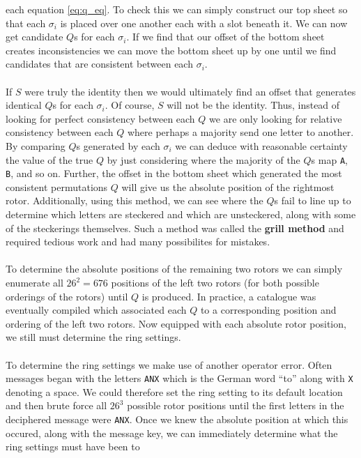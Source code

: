each equation \ref{eq:q_eq}. To check this we can simply construct
our top sheet so that each $\sigma_i$ is placed over one another each
with a slot beneath it. We can now get candidate $Q$s for each
$\sigma_i$. If we find that our offset of the bottom sheet creates
inconsistencies we can move the bottom sheet up by one until we find
candidates that are consistent between each $\sigma_i$.
\\\\If $S$ were truly the identity then we would ultimately find an
offset that generates identical $Q$s for each $\sigma_i$. Of course,
$S$ will not be the identity. Thus, instead of looking for perfect
consistency between each $Q$ we are only looking for relative
consistency between each $Q$ where perhaps a majority send one letter
to another. By comparing $Q$s generated by each $\sigma_i$ we can
deduce with reasonable certainty the value of the true $Q$ by just
considering where the majority of the $Q$s map \texttt{A},
\texttt{B}, and so on. Further, the offset in the bottom sheet which
generated the most consistent permutations $Q$ will give us the
absolute position of the rightmost rotor. Additionally, using this
method, we can see where the $Q$s fail to line up to determine which
letters are steckered and which are unsteckered, along with some of
the steckerings themselves. Such a method was called the {\bf{grill
			method}} and required tedious work and had many possibilites for mistakes.
\\\\To determine the absolute positions of the remaining two rotors
we can simply enumerate all $26^2 = 676$ positions of the left two
rotors (for both possible orderings of the rotors) until $Q$ is
produced. In practice, a catalogue was eventually compiled which
associated each $Q$ to a corresponding position and ordering of the
left two rotors. Now equipped with each absolute rotor position, we
still must determine the ring settings.
\\\\To determine the ring settings we make use of another operator
error. Often messages began with the letters \texttt{ANX} which is
the German word ``to'' along with \texttt{X} denoting a space. We
could therefore set the ring setting to its default location and then
brute force all $26^3$ possible rotor positions until the first
letters in the deciphered message were \texttt{ANX}. Once we knew the
absolute position at which this occured, along with the message key,
we can immediately determine what the ring settings must have been to
